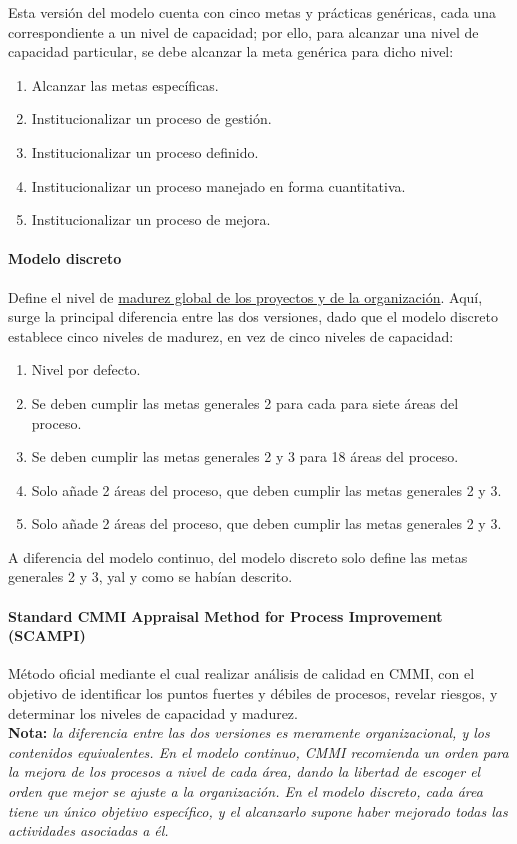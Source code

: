 Esta versión del modelo cuenta con cinco metas y prácticas genéricas, cada una correspondiente a un nivel de capacidad; por ello, para alcanzar una nivel de capacidad particular, se debe alcanzar la meta genérica para dicho nivel:

\begin{enumerate}
    \item Alcanzar las metas específicas.
    \item Institucionalizar un proceso de gestión.
    \item Institucionalizar un proceso definido.
    \item Institucionalizar un proceso manejado en forma cuantitativa.
    \item Institucionalizar un proceso de mejora.
\end{enumerate}

\paragraph{Modelo discreto} Define el nivel de \uline{madurez global de los proyectos y de la organización}. Aquí, surge la principal diferencia entre las dos versiones, dado que el modelo discreto establece cinco niveles de madurez, en vez de cinco niveles de capacidad:

\begin{enumerate}
    \item Nivel por defecto.
    \item Se deben cumplir las metas generales 2 para cada para siete áreas del proceso.
    \item Se deben cumplir las metas generales 2 y 3 para 18 áreas del proceso.
    \item Solo añade 2 áreas del proceso, que deben cumplir las metas generales 2 y 3.
    \item Solo añade 2 áreas del proceso, que deben cumplir las metas generales 2 y 3.
\end{enumerate}

A diferencia del modelo continuo, del modelo discreto solo define las metas generales 2 y 3, yal y como se habían descrito.

\paragraph{Standard CMMI Appraisal Method for Process Improvement (SCAMPI)}

Método oficial mediante el cual realizar análisis de calidad en CMMI, con el objetivo de identificar los puntos fuertes y débiles de procesos, revelar riesgos, y determinar los niveles de capacidad y madurez.\\

\textbf{Nota:} \textit{la diferencia entre las dos versiones es meramente organizacional, y los contenidos equivalentes. En el modelo continuo, CMMI recomienda un orden para la mejora de los procesos a nivel de cada área, dando la libertad de escoger el orden que mejor se ajuste a la organización. En el modelo discreto, cada área tiene un único objetivo específico, y el alcanzarlo supone haber mejorado todas las actividades asociadas a él.}